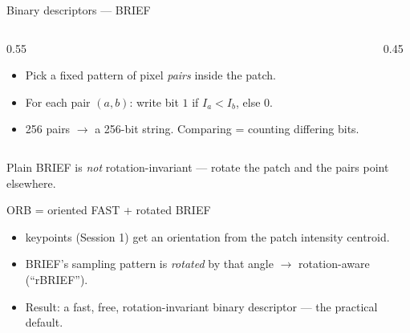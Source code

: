 \documentclass[10pt,aspectratio=169]{beamer}
\begin{document}
\begin{frame}{Binary descriptors — BRIEF}
  \begin{columns}[T]
    \begin{column}{0.55\textwidth}
      \begin{itemize}
        \item Pick a fixed pattern of pixel \emph{pairs} inside the patch.
        \item For each pair $(a,b)$: write bit $1$ if $I_a<I_b$, else $0$.
        \item 256 pairs $\rightarrow$ a 256-bit string. Comparing = counting differing bits.
      \end{itemize}
    \end{column}
    \begin{column}{0.45\textwidth}
      \begin{center}
      \end{center}
    \end{column}
  \end{columns}
  \begin{badbox}
    Plain BRIEF is \emph{not} rotation-invariant — rotate the patch and the pairs point elsewhere.
  \end{badbox}
\end{frame}

\begin{frame}{ORB = oriented FAST + rotated BRIEF}
  \begin{itemize}
    \item {} keypoints (Session 1) get an orientation from the patch intensity centroid.
    \item BRIEF's sampling pattern is \emph{rotated} by that angle $\rightarrow$ rotation-aware (``rBRIEF'').
    \item Result: a fast, free, rotation-invariant binary descriptor — the practical default.
  \end{itemize}
\end{frame}
\end{document}
